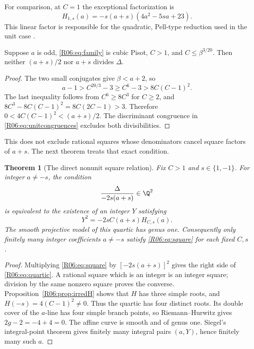 \documentclass[11pt,a4paper]{article}
\newtheorem{theorem}{Theorem}[section]
\theoremstyle{definition}\newtheorem{definition}[theorem]{Definition}
\theoremstyle{remark}\newtheorem{remark}[theorem]{Remark}
\begin{document}
For comparison, at $C=1$ the exceptional factorization is
\[
 H_{1,s}(a)=-s(a+s)(4a^2-5sa+23).
\]
This linear factor is responsible for the quadratic, Pell-type
reduction used in the unit case \cite{R03}.

\begin{proposition}
\label{R06:prop:nocancel}
Suppose $a$ is odd, \eqref{R06:eq:family} is cubic Pisot, $C>1$, and
$C\le\beta^{3/20}$. Then neither $(a+s)/2$ nor $a+s$ divides $\Delta$.
\end{proposition}
\begin{proof}
The two small conjugates give $\beta<a+2$, so
\[
 a-1>C^{20/3}-3\ge C^6-3>8C(C-1)^2.
\]
The last inequality follows from $C^6\ge8C^3$ for $C\ge2$, and
$8C^3-8C(C-1)^2=8C(2C-1)>3$.
Therefore $0<4C(C-1)^2<(a+s)/2$.
The discriminant congruence in \eqref{R06:eq:unitcongruences} excludes
both divisibilities.
\end{proof}

This does not exclude rational squares whose denominators cancel
square factors of $a+s$. The next theorem treats that exact condition.

\begin{theorem}[The direct nonunit square relation]\label{R06:thm:genus}
Fix $C>1$ and $s\in\{1,-1\}$. For integer $a\ne-s$, the condition
\begin{equation}\label{R06:eq:square}
 \frac{\Delta}{-2s(a+s)}\in\Q^2
\end{equation}
is equivalent to the existence of an integer $Y$ satisfying
\begin{equation}\label{R06:eq:quartic}
 Y^2=-2sC(a+s)H_{C,s}(a).
\end{equation}
The smooth projective model of this quartic has genus one.
Consequently only finitely many integer coefficients $a\ne-s$
satisfy \eqref{R06:eq:square} for each fixed $C,s$.
\end{theorem}
\begin{proof}
Multiplying \eqref{R06:eq:square} by $[-2s(a+s)]^2$ gives the right side
of \eqref{R06:eq:quartic}. A rational square which is an integer is an
integer square; division by the same nonzero square proves the
converse. Proposition~\ref{R06:prop:irredH} shows that $H$ has three
simple roots, and $H(-s)=4(C-1)^2\ne0$.
Thus the quartic has four distinct roots. Its double cover of the
$a$-line has four simple branch points, so Riemann--Hurwitz gives
$2g-2=-4+4=0$. The affine curve is smooth and of genus one.
Siegel's integral-point theorem \cite{Siegel,R06-Lang} gives finitely
many integral pairs $(a,Y)$, hence finitely many such $a$.
\end{proof}
\end{document}
